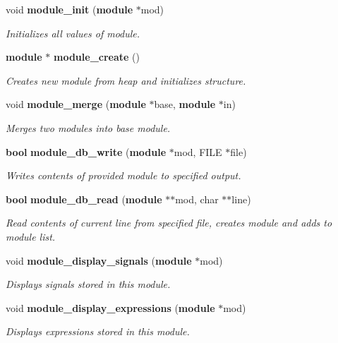 \begin{CompactItemize}
\item 
void {\bf module\_\-init} ({\bf module} $\ast$mod)
\begin{CompactList}\small\item\em Initializes all values of module.\item\end{CompactList}\item 
{\bf module} $\ast$ {\bf module\_\-create} ()
\begin{CompactList}\small\item\em Creates new module from heap and initializes structure.\item\end{CompactList}\item 
void {\bf module\_\-merge} ({\bf module} $\ast$base, {\bf module} $\ast$in)
\begin{CompactList}\small\item\em Merges two modules into base module.\item\end{CompactList}\item 
{\bf bool} {\bf module\_\-db\_\-write} ({\bf module} $\ast$mod, FILE $\ast$file)
\begin{CompactList}\small\item\em Writes contents of provided module to specified output.\item\end{CompactList}\item 
{\bf bool} {\bf module\_\-db\_\-read} ({\bf module} $\ast$$\ast$mod, char $\ast$$\ast$line)
\begin{CompactList}\small\item\em Read contents of current line from specified file, creates module and adds to module list.\item\end{CompactList}\item 
void {\bf module\_\-display\_\-signals} ({\bf module} $\ast$mod)
\begin{CompactList}\small\item\em Displays signals stored in this module.\item\end{CompactList}\item 
void {\bf module\_\-display\_\-expressions} ({\bf module} $\ast$mod)
\begin{CompactList}\small\item\em Displays expressions stored in this module.\item\end{CompactList}\item 

\end{CompactItemize}
